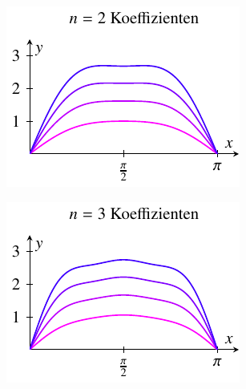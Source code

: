 \begin{figure}
	\centering
	
	
	\begin{subfigure}{0.48\textwidth}
		\centering
		\includegraphics{papers/antennen/fig/a2.pdf}
	\end{subfigure}%
	\hfill
	\begin{subfigure}{0.48\textwidth}
		\centering
		\includegraphics{papers/antennen/fig/a3.pdf}

\end{subfigure}
\end{figure}
